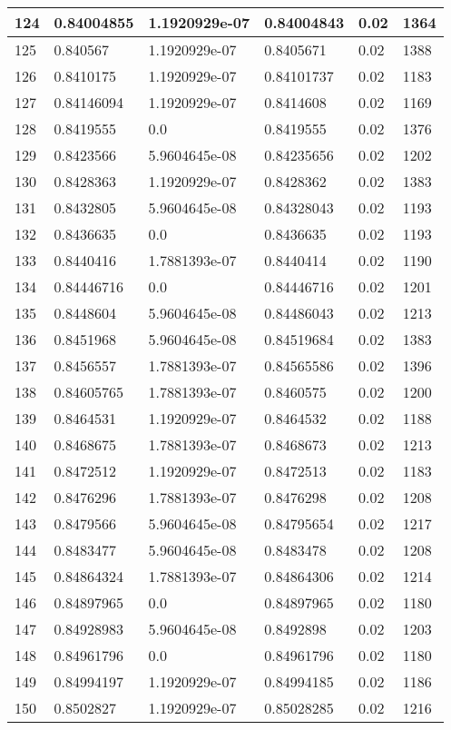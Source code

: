 \begin{longtable}{|l|l|l|l|l|l|}
124 & 0.84004855 & 1.1920929e-07 & 0.84004843 & 0.02 & 1364 \\ \hline 
125 & 0.840567 & 1.1920929e-07 & 0.8405671 & 0.02 & 1388 \\ \hline 
126 & 0.8410175 & 1.1920929e-07 & 0.84101737 & 0.02 & 1183 \\ \hline 
127 & 0.84146094 & 1.1920929e-07 & 0.8414608 & 0.02 & 1169 \\ \hline 
128 & 0.8419555 & 0.0 & 0.8419555 & 0.02 & 1376 \\ \hline 
129 & 0.8423566 & 5.9604645e-08 & 0.84235656 & 0.02 & 1202 \\ \hline 
130 & 0.8428363 & 1.1920929e-07 & 0.8428362 & 0.02 & 1383 \\ \hline 
131 & 0.8432805 & 5.9604645e-08 & 0.84328043 & 0.02 & 1193 \\ \hline 
132 & 0.8436635 & 0.0 & 0.8436635 & 0.02 & 1193 \\ \hline 
133 & 0.8440416 & 1.7881393e-07 & 0.8440414 & 0.02 & 1190 \\ \hline 
134 & 0.84446716 & 0.0 & 0.84446716 & 0.02 & 1201 \\ \hline 
135 & 0.8448604 & 5.9604645e-08 & 0.84486043 & 0.02 & 1213 \\ \hline 
136 & 0.8451968 & 5.9604645e-08 & 0.84519684 & 0.02 & 1383 \\ \hline 
137 & 0.8456557 & 1.7881393e-07 & 0.84565586 & 0.02 & 1396 \\ \hline 
138 & 0.84605765 & 1.7881393e-07 & 0.8460575 & 0.02 & 1200 \\ \hline 
139 & 0.8464531 & 1.1920929e-07 & 0.8464532 & 0.02 & 1188 \\ \hline 
140 & 0.8468675 & 1.7881393e-07 & 0.8468673 & 0.02 & 1213 \\ \hline 
141 & 0.8472512 & 1.1920929e-07 & 0.8472513 & 0.02 & 1183 \\ \hline 
142 & 0.8476296 & 1.7881393e-07 & 0.8476298 & 0.02 & 1208 \\ \hline 
143 & 0.8479566 & 5.9604645e-08 & 0.84795654 & 0.02 & 1217 \\ \hline 
144 & 0.8483477 & 5.9604645e-08 & 0.8483478 & 0.02 & 1208 \\ \hline 
145 & 0.84864324 & 1.7881393e-07 & 0.84864306 & 0.02 & 1214 \\ \hline 
146 & 0.84897965 & 0.0 & 0.84897965 & 0.02 & 1180 \\ \hline 
147 & 0.84928983 & 5.9604645e-08 & 0.8492898 & 0.02 & 1203 \\ \hline 
148 & 0.84961796 & 0.0 & 0.84961796 & 0.02 & 1180 \\ \hline 
149 & 0.84994197 & 1.1920929e-07 & 0.84994185 & 0.02 & 1186 \\ \hline 
150 & 0.8502827 & 1.1920929e-07 & 0.85028285 & 0.02 & 1216 \\ \hline 
\end{longtable}